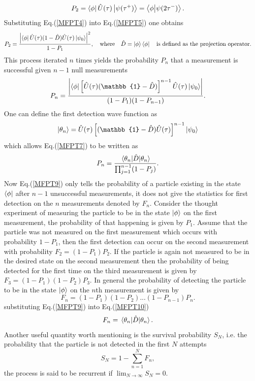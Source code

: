 \documentclass{article}
\numberwithin{equation}{section}
\newcommand{\1}{\mathbb{1}}
\newcommand{\state}{\ket{\phi}}
\newcommand{\projection}{\bra{\phi}}
\begin{document}
\begin{equation}\label{MFPT5}
    P_2=\projection \hat{U}(\tau)\ket{\psi(\tau^+)}=\projection\ket{\psi(2\tau^-)}.
\end{equation}
Substituting Eq.(\ref{MFPT4}) into Eq.(\ref{MFPT5}) one obtains
\begin{equation}\label{MFPT6}
    P_2=\frac{\abs{\projection\hat{U}(\tau)(1-\hat{D})\hat{U}(\tau)\ket{\psi_0}}^2}{1-P_1}, \quad \text{where}\quad \hat{D}=\state\projection \quad \text{is defined as the projection operator.}
\end{equation}
This process iterated $n$ times yields the probability $P_n$ that a measurement is successful given $n-1$ null measurements
\begin{equation}\label{MFPT7}
    P_n=\frac
    {\abs
    {\projection \left[\hat{U}(\tau)(\1-\hat{D})\right]^{n-1}\hat{U}(\tau)\ket{\psi_0}}}
    {(1-P_1)(1-P_{n-1})}.
\end{equation}
One can define the first detection wave function as
\begin{equation}\label{MFPT8}
    \ket{\theta_n}=\hat{U}(\tau)\left[(\1-\hat{D})\hat{U}(\tau)\right]^{n-1}\ket{\psi_0}
\end{equation}
which allows Eq.(\ref{MFPT7}) to be written as
\begin{equation}\label{MFPT9}
    P_n=\frac
    {\ev{\hat{D}}{\theta_n}}
    {\prod_{j=1}^{n-1}(1-P_j)}.
\end{equation}
Now Eq.(\ref{MFPT9}) only tells the probability of a particle existing in the state $\projection$ after $n-1$ unsuccessful measurements, it does not give the statistics for first detection on the $n$ measurements denoted by $F_n$. Consider the thought experiment of measuring the particle to be in the state $\ket{\phi}$ on the first measurement, the probability of that happening is given by $P_1$. Assume that the particle was not measured on the first measurement which occurs with probability $1-P_1$, then the first detection can occur on the second measurement with probability $F_2=(1-P_1)P_2$. If the particle is again not measured to be in the desired state on the second measurement then the probability of being detected for the first time on the third measurement is given by $F_3=(1-P_1)(1-P_2)P_3$. In general the probability of detecting the particle to be in the state $\state$ on the $n$th measurement is given by 
\begin{equation}\label{MFPT10}
    F_n=(1-P_1)(1-P_2)...(1-P_{n-1})P_n.
\end{equation}
substituting Eq.(\ref{MFPT9}) into Eq.(\ref{MFPT10}) 
\begin{equation}\label{MFPT11}
    F_n=\ev{\hat{D}}{\theta_n}.
\end{equation}
Another useful quantity worth mentioning is the survival probability $S_N$, i.e. the probability that the particle is not detected in the first $N$ attempts
\begin{equation}\label{MFPT12}
    S_N=1-\sum_{n=1}^NF_n,
\end{equation}
the process is said to be recurrent if $\lim_{N\to\infty}S_N=0$.
\end{document}

